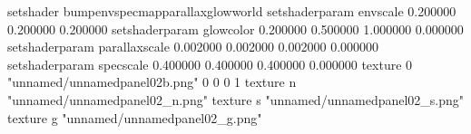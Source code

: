 setshader bumpenvspecmapparallaxglowworld
setshaderparam envscale 0.200000 0.200000 0.200000
setshaderparam glowcolor 0.200000 0.500000 1.000000 0.000000
setshaderparam parallaxscale 0.002000 0.002000 0.002000 0.000000
setshaderparam specscale 0.400000 0.400000 0.400000 0.000000
texture 0 "unnamed/unnamedpanel02b.png" 0 0 0 1
texture n "unnamed/unnamedpanel02_n.png"
texture s "unnamed/unnamedpanel02_s.png"
texture g "unnamed/unnamedpanel02_g.png"